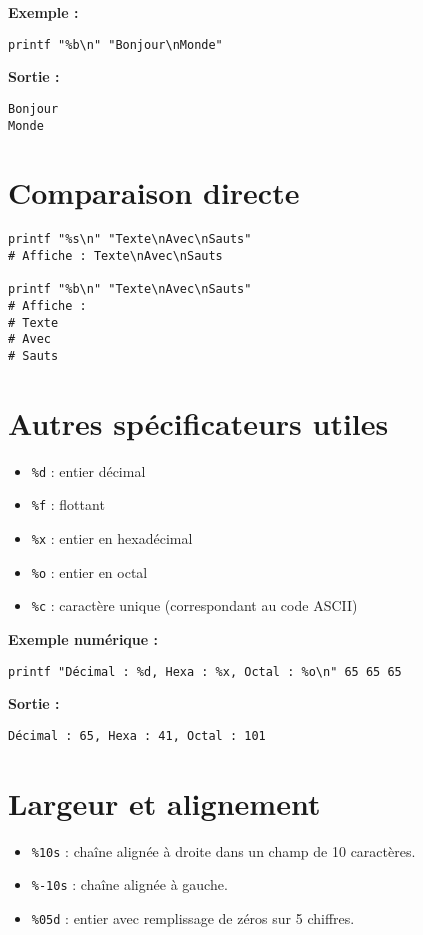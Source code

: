 \documentclass[11pt,a4paper]{article}
\begin{document}
\textbf{Exemple :}
\begin{lstlisting}
printf "%b\n" "Bonjour\nMonde"
\end{lstlisting}

\textbf{Sortie :}
\begin{verbatim}
Bonjour
Monde
\end{verbatim}

\section*{Comparaison directe}
\begin{lstlisting}
printf "%s\n" "Texte\nAvec\nSauts"
# Affiche : Texte\nAvec\nSauts

printf "%b\n" "Texte\nAvec\nSauts"
# Affiche :
# Texte
# Avec
# Sauts
\end{lstlisting}

\section*{Autres spécificateurs utiles}
\begin{itemize}
  \item \texttt{\%d} : entier décimal
  \item \texttt{\%f} : flottant
  \item \texttt{\%x} : entier en hexadécimal
  \item \texttt{\%o} : entier en octal
  \item \texttt{\%c} : caractère unique (correspondant au code ASCII)
\end{itemize}

\textbf{Exemple numérique :}
\begin{lstlisting}
printf "Décimal : %d, Hexa : %x, Octal : %o\n" 65 65 65
\end{lstlisting}

\textbf{Sortie :}
\begin{verbatim}
Décimal : 65, Hexa : 41, Octal : 101
\end{verbatim}

\section*{Largeur et alignement}
\begin{itemize}
  \item \texttt{\%10s} : chaîne alignée à droite dans un champ de 10 caractères.
  \item \texttt{\%-10s} : chaîne alignée à gauche.
  \item \texttt{\%05d} : entier avec remplissage de zéros sur 5 chiffres.
\end{itemize}
\end{document}
